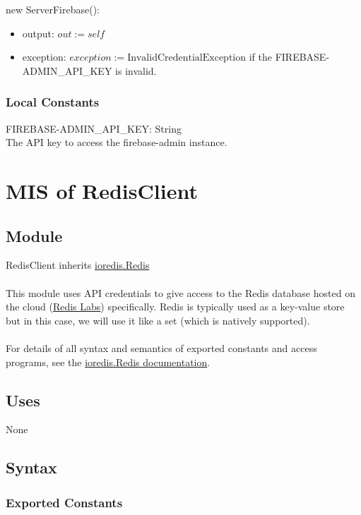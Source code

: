 \documentclass[12pt, titlepage]{article}
\begin{document}
\noindent new ServerFirebase():
\begin{itemize} 
\item output: $out := self$ 
\item exception: $exception := \text{InvalidCredentialException}$ if the FIREBASE-ADMIN\_API\_KEY is invalid.  
\end{itemize} 

\subsubsection{Local Constants}

FIREBASE-ADMIN\_API\_KEY: String \\
The API key to access the firebase-admin instance.
  
\medskip
\newpage
\section{MIS of RedisClient} \label{RedisClient} 

\subsection{Module}

RedisClient inherits \href{https://luin.github.io/ioredis/classes/Redis.html}{ioredis.Redis} \\ \\
This module uses API credentials to give access to the Redis database hosted on the cloud (\href{https://app.redislabs.com/#/}{Redis Labs}) specifically. Redis is typically used as a key-value store but in this case, we will use it like a set (which is natively supported). 
\\
\\For details of all syntax and semantics of exported constants and access programs, see the \href{https://luin.github.io/ioredis/classes/Redis.html}{ioredis.Redis documentation}. 
\subsection{Uses}

None

\subsection{Syntax}

\subsubsection{Exported Constants}
\end{document}
